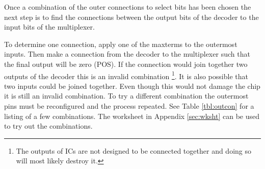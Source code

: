 \documentclass[12pt]{article}
\begin{document}
Once a combination of the outer connections to select bits 
has been chosen the next step is to find the connections
between the output bits of the decoder to the input bits
of the multiplexer.

To determine one connection, apply one of the maxterms to the
outermost inputs.
Then make a connection from the decoder to the multiplexer
such that the final output will be zero (POS).
If the connection would join together two outputs of the
decoder this is an invalid combination
\footnote{The outputs of ICs are not designed to be connected
together and doing so will most likely destroy it.}.
It is also possible that two inputs could be joined together.
Even though this would not damage the chip it is still an invalid
combination.
To try a different combination the outermost pins must be reconfigured
and the process repeated.
See Table \ref{tbl:outcon} for a listing of a few combinations.
The worksheet in Appendix \ref{sec:wksht} can be used to try out the combinations.
\end{document}
